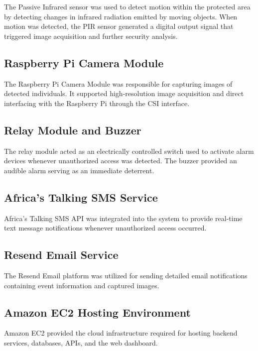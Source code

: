 \documentclass[12pt,a4paper,oneside]{report}
\begin{document}
The Passive Infrared sensor was used to detect motion within the protected area by detecting changes in infrared radiation emitted by moving objects. When motion was detected, the PIR sensor generated a digital output signal that triggered image acquisition and further security analysis.

\subsection{Raspberry Pi Camera Module}

The Raspberry Pi Camera Module was responsible for capturing images of detected individuals. It supported high-resolution image acquisition and direct interfacing with the Raspberry Pi through the CSI interface.

\subsection{Relay Module and Buzzer}

The relay module acted as an electrically controlled switch used to activate alarm devices whenever unauthorized access was detected. The buzzer provided an audible alarm serving as an immediate deterrent.

\subsection{Africa's Talking SMS Service}

Africa's Talking SMS API was integrated into the system to provide real-time text message notifications whenever unauthorized access occurred.

\subsection{Resend Email Service}

The Resend Email platform was utilized for sending detailed email notifications containing event information and captured images.

\subsection{Amazon EC2 Hosting Environment}

Amazon EC2 provided the cloud infrastructure required for hosting backend services, databases, APIs, and the web dashboard.
\end{document}
